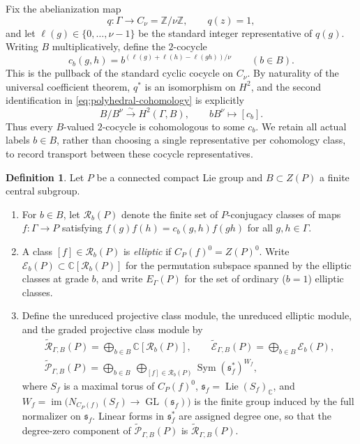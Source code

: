 \documentclass[11pt,a4paper,reqno]{amsart}
\theoremstyle{plain}
\theoremstyle{definition}
\newtheorem{definition}[theorem]{Definition}
\theoremstyle{remark}
\numberwithin{equation}{section}
\DeclareMathOperator{\Lie}{Lie}
\DeclareMathOperator{\Sym}{Sym}
\DeclareMathOperator{\im}{im}
\newcommand{\CC}{\mathbb C}
\newcommand{\ZZ}{\mathbb Z}
\newcommand{\cE}{\mathcal E}
\newcommand{\cR}{\mathcal R}
\newcommand{\wtE}{\widetilde{\mathcal E}}
\newcommand{\wtP}{\widetilde{\mathcal P}}
\newcommand{\wtR}{\widetilde{\mathcal R}}
\begin{document}
Fix the abelianization map
\[
q\colon\Gamma\longrightarrow C_\nu=\ZZ/\nu\ZZ,
\qquad q(z)=1,
\]
and let $\ell(g)\in\{0,\ldots,\nu-1\}$ be the standard integer representative of $q(g)$. Writing $B$ multiplicatively, define the $2$-cocycle
\[
c_b(g,h)=b^{(\ell(g)+\ell(h)-\ell(gh))/\nu}\qquad(b\in B).
\]
This is the pullback of the standard cyclic cocycle on $C_\nu$. By naturality of the universal coefficient theorem, $q^*$ is an isomorphism on $H^2$, and the second identification in \eqref{eq:polyhedral-cohomology} is explicitly
\[
B/B^\nu\xrightarrow{\sim}H^2(\Gamma,B),\qquad bB^\nu\longmapsto[c_b].
\]
Thus every $B$-valued $2$-cocycle is cohomologous to some $c_b$. We retain all actual labels $b\in B$, rather than choosing a single representative per cohomology class, to record transport between these cocycle representatives.

\begin{definition}\label{def:projective-modules}
Let $P$ be a connected compact Lie group and $B\subset Z(P)$ a finite central subgroup.
\begin{enumerate}[label=\textup{(\arabic*)},leftmargin=2em]
\item For $b\in B$, let $\cR_b(P)$ denote the finite set of $P$-conjugacy classes of maps $f\colon\Gamma\to P$ satisfying $f(g)f(h)=c_b(g,h)f(gh)$ for all $g,h\in\Gamma$.
\item A class $[f]\in\cR_b(P)$ is \emph{elliptic} if $C_P(f)^0=Z(P)^0$. Write $\cE_b(P)\subset\CC[\cR_b(P)]$ for the permutation subspace spanned by the elliptic classes at grade $b$, and write $E_\Gamma(P)$ for the set of ordinary ($b=1$) elliptic classes.
\item Define the unreduced projective class module, the unreduced elliptic module, and the graded projective class module by
\[
\begin{gathered}
\wtR_{\Gamma,B}(P)=\bigoplus_{b\in B}\CC[\cR_b(P)],\qquad
\wtE_{\Gamma,B}(P)=\bigoplus_{b\in B}\cE_b(P),\\
\wtP_{\Gamma,B}(P)=\bigoplus_{b\in B}\ \bigoplus_{[f]\in\cR_b(P)}\Sym(\mathfrak s_f^*)^{W_f},
\end{gathered}
\]
where $S_f$ is a maximal torus of $C_P(f)^0$, $\mathfrak s_f=\Lie(S_f)_{\CC}$, and $W_f=\im\bigl(N_{C_P(f)}(S_f)\to\operatorname{GL}(\mathfrak s_f)\bigr)$ is the finite group induced by the full normalizer on $\mathfrak s_f$. Linear forms in $\mathfrak s_f^*$ are assigned degree one, so that the degree-zero component of $\wtP_{\Gamma,B}(P)$ is $\wtR_{\Gamma,B}(P)$.
\end{enumerate}
\end{definition}
\end{document}
